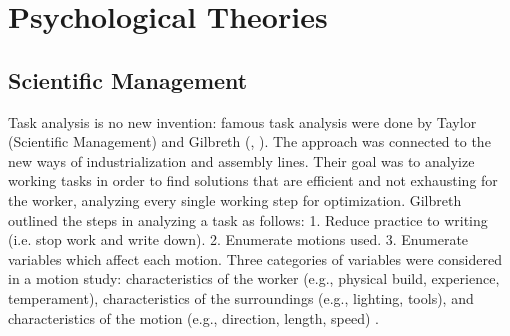 \section{Psychological Theories}

\subsection{Scientific Management}
Task analysis is no new invention: famous task analysis were done by Taylor (Scientific Management) and Gilbreth (\cite{taylor2013scientific}, \cite{gilbreth1911motion}). The approach was connected to the new ways of industrialization and assembly lines. Their goal was to analyize working tasks in order to find solutions that are efficient and not exhausting for the worker, analyzing every single working step for optimization. Gilbreth outlined the steps in analyzing a task as follows: 1. Reduce practice to writing (i.e. stop work and write down). 2. Enumerate motions used. 3. Enumerate variables which affect each motion. Three categories of variables were considered in a motion study: characteristics of the worker (e.g., physical build, experience, temperament), characteristics of the surroundings (e.g., lighting, tools), and characteristics of the motion (e.g., direction, length, speed) \cite{creighton1992origin}.

